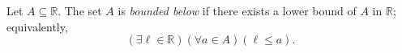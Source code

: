 \begin{definition}
\label{def:bounded-below}
Let $A\subseteq\mathbb{R}$. The set $A$ is \emph{bounded below} if there
exists a lower bound of $A$ in $\mathbb{R}$; equivalently,
\[
  (\exists \ell\in\mathbb{R})(\forall a\in A)(\ell\leq a).
\]
\end{definition}
